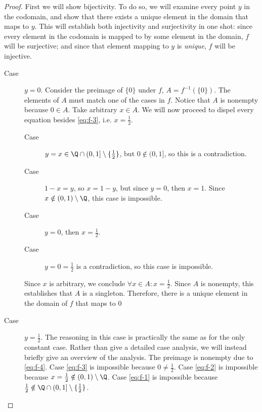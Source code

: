 \documentclass[letterpaper,11pt]{article}
\newcommand{\intersn}{\cap}
\newcommand{\half}{\frac{1}{2}}
\begin{document}
\begin{proof}
    First we will show bijectivity. To do so, we will examine every point $y$
    in the codomain, and show that there exists a unique element in the domain
    that maps to $y$. This will establish both injectivity and surjectivity in
    one shot: since every element in the codomain is mapped to by some element
    in the domain, $f$ will be surjective; and since that element mapping to
    $y$ is \emph{unique}, $f$ will be injective.

    \begin{description}
        \item[Case] $y = 0$.
            Consider the preimage of $\{0\}$ under $f$, $A = f^{-1}(\{0\})$.
            The elements of $A$ must match one of the cases in $f$. Notice that
            $A$ is nonempty because $0 \in A$.
            Take arbitrary $x \in A$. We will now proceed to dispel every
            equation besides \eqref{eq:f-3}, i.e. $x = \half$.
            \begin{description}
                \item[Case] $y = x \in \Q \intersn (0, 1] \setminus \{\half\}$,
                    but $0 \notin (0, 1]$, so this is a contradiction.
                \item[Case] $1 - x = y$, so $x = 1 - y$, but since $y = 0$,
                    then $x = 1$. Since $x \notin (0, 1) \setminus \Q$, this
                    case is impossible.
                \item[Case] $y = 0$, then $x = \half$.
                \item[Case] $y = 0 = \half$ is a contradiction, so this case is
                    impossible.
            \end{description}
            Since $x$ is arbitrary, we conclude $\forall x \in A: x = \half$.
            Since $A$ is nonempty, this establishes that $A$ is a singleton.
            Therefore, there is a unique element in the domain of $f$ that maps
            to $0$

        \item[Case] $y = \half$.
            The reasoning in this case is practically the same as for the only
            constant case. Rather than give a detailed case analysis, we will
            instead briefly give an overview of the analysis. The preimage is
            nonempty due to \eqref{eq:f-4}. Case \eqref{eq:f-3} is impossible
            because $0 \neq \half$. Case \eqref{eq:f-2} is impossible because
            $x = \half \notin (0, 1) \setminus \Q$. Case \eqref{eq:f-1} is
            impossible because
            $\half \notin \Q \intersn (0, 1] \setminus \{\half\}$.


\end{description}
\end{proof}
\end{document}
